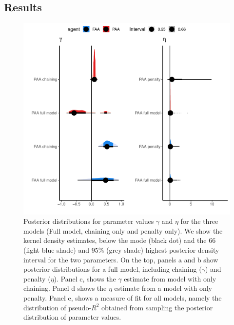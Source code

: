 \documentclass[
  12pt,
]{article}
\begin{document}
\hypertarget{results}{%
\subsection{Results}\label{results}}

\begin{figure}
\includegraphics[width=1\linewidth]{manuscript_BE_files/figure-latex/post-1} \caption{Posterior distributions for parameter values $\gamma$ and $\eta$ for the three models (Full model, chaining only and penalty only). We show the kernel density estimates, below the mode (black dot) and the 66 (light blue shade) and 95\% (grey shade)  highest posterior density interval for the two parameters. On the top, panels a and b show posterior distributions for a full model, including chaining ($\gamma$) and penalty ($\eta$). Panel c, shows the $\gamma$ estimate from model with only chaining. Panel d shows the $\eta$ estimate from a model with only penalty. Panel e, shows a measure of fit for all models, namely the distribution of pseudo-$R^2$ obtained from sampling the posterior distribution of parameter values.}\label{fig:post}
\end{figure}
\end{document}
